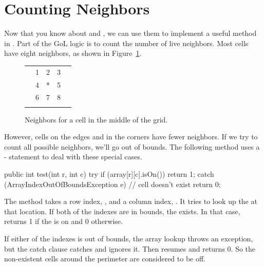 \section{Counting Neighbors}


Now that you know about  and , we can use them to implement a useful method in .
Part of the GoL logic is to count the number of live neighbors.
Most cells have eight neighbors, as shown in Figure~\ref{fig:neighbors}.

\begin{figure}[!ht]
\begin{center}
\begin{tabular}{|p{1em}|p{1em}|p{1em}|p{1em}|p{1em}|}
\hline
  &   &   &   &   \\
\hline
  & 1 & 2 & 3 &   \\
\hline
  & 4 & * & 5 &   \\
\hline
  & 6 & 7 & 8 &   \\
\hline
  &   &   &   &   \\
\hline
\end{tabular}
\caption{Neighbors for a cell in the middle of the grid.}
\label{fig:neighbors}
\end{center}
\end{figure}

However, cells on the edges and in the corners have fewer neighbors.
If we try to count all possible neighbors, we'll go out of bounds.
The following method uses a - statement to deal with these special cases.

\begin{code}
public int test(int r, int c) {
    try {
        if (array[r][c].isOn()) {
            return 1;
        }
    } catch (ArrayIndexOutOfBoundsException e) {
        // cell doesn't exist
    }
    return 0;
}
\end{code}

The  method takes a row index, , and a column index, .
It tries to look up the  at that location.
If both of the indexes are in bounds, the  exists.
In that case,  returns 1 if the  is on and 0 otherwise.

If either of the indexes is out of bounds, the array lookup throws an exception, but the catch clause catches and ignores it.
Then  resumes and returns 0.
So the non-existent cells around the perimeter are considered to be off.

